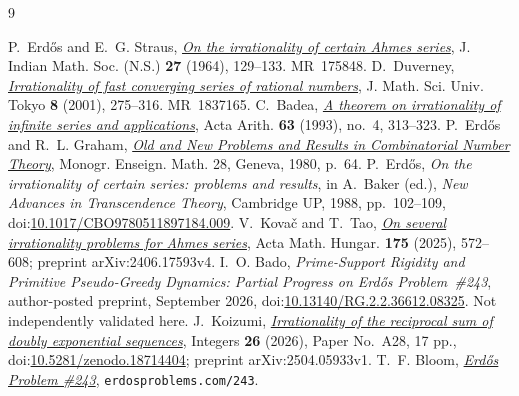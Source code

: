 \documentclass[11pt]{article}
\begin{document}
\begin{thebibliography}{9}
\small
\raggedright
\setlength{\itemsep}{0pt}
 P.~Erd\H{o}s and E.~G. Straus,
  \href{https://users.renyi.hu/~p_erdos/1964-19.pdf}{\emph{On the irrationality
  of certain Ahmes series}},
  J. Indian Math. Soc. (N.S.) \textbf{27} (1964), 129--133. MR~175848.
 D.~Duverney,
  \href{https://www.ms.u-tokyo.ac.jp/journal/pdf/jms080206.pdf}
  {\emph{Irrationality of fast converging series of rational numbers}},
  J. Math. Sci. Univ. Tokyo \textbf{8} (2001), 275--316. MR~1837165.
 C.~Badea,
  \href{https://matwbn.icm.edu.pl/ksiazki/aa/aa63/aa6342.pdf}{\emph{A theorem
  on irrationality of infinite series and applications}}, Acta Arith.
  \textbf{63} (1993), no.~4, 313--323.
 P.~Erd\H{o}s and R.~L. Graham,
  \href{https://mathweb.ucsd.edu/~ronspubs/80_11_number_theory.pdf}{\emph{Old
  and New Problems and Results in Combinatorial Number Theory}},
  Monogr. Enseign. Math. 28, Geneva, 1980, p.~64.
 P.~Erd\H{o}s, \emph{On the irrationality of certain series:
  problems and results}, in A.~Baker (ed.), \emph{New Advances in Transcendence
  Theory}, Cambridge UP, 1988, pp.~102--109,
  doi:\href{https://doi.org/10.1017/CBO9780511897184.009}{10.1017/CBO9780511897184.009}.
 V.~Kova\v{c} and T.~Tao,
  \href{https://arxiv.org/abs/2406.17593}{\emph{On several irrationality
  problems for Ahmes series}}, Acta Math. Hungar. \textbf{175} (2025),
  572--608; preprint arXiv:2406.17593v4.
 I.~O. Bado,
  \emph{Prime-Support Rigidity and Primitive Pseudo-Greedy Dynamics:
  Partial Progress on Erd\H{o}s Problem~\#243}, author-posted preprint,
  September 2026, doi:\href{https://doi.org/10.13140/RG.2.2.36612.08325}
  {10.13140/RG.2.2.36612.08325}.  Not independently validated here.
 J.~Koizumi,
  \href{https://math.colgate.edu/~integers/aa28/aa28.pdf}
  {\emph{Irrationality of the reciprocal sum of doubly exponential sequences}},
  Integers \textbf{26} (2026), Paper No.~A28, 17 pp.,
  doi:\href{https://doi.org/10.5281/zenodo.18714404}{10.5281/zenodo.18714404};
  preprint arXiv:2504.05933v1.
 T.~F. Bloom,
  \href{https://www.erdosproblems.com/243}{\emph{Erd\H{o}s Problem \#243}},
  \texttt{erdosproblems.com/243}.
\end{thebibliography}
\end{document}
